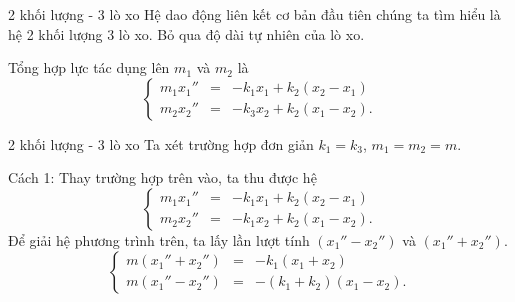 \begin{frame}{2 khối lượng - 3 lò xo}
    Hệ dao động liên kết cơ bản đầu tiên chúng ta tìm hiểu là hệ 2 khối lượng 3 lò xo. Bỏ qua độ dài tự nhiên của lò xo.
    \vspace{2mm}
    \begin{center}
        \scalebox{1}{}
    \end{center}
    Tổng hợp lực tác dụng lên $m_1$ và $m_2$ là
    \begin{equation}
    \left\{
    \begin{array}{ccc}
    m_1 x_1'' &=& - k_1 x_1 + k_2 (x_2 - x_1) \\
    m_2 x_2'' &=& - k_3 x_2 + k_2 (x_1 - x_2).
    \end{array}
    \right.
    \label{3.1_1}
    \end{equation}
\end{frame}

\begin{frame}{2 khối lượng - 3 lò xo}
    Ta xét trường hợp đơn giản $k_1 = k_3$, $m_1 = m_2 = m$. 

    Cách 1: Thay trường hợp trên vào, ta thu được hệ
    \begin{equation}
    \left\{
    \begin{array}{ccc}
    m_1 x_1'' &=& - k_1 x_1 + k_2 (x_2 - x_1) \\
    m_2 x_2'' &=& - k_1 x_2 + k_2 (x_1 - x_2).
    \end{array}
    \right.
    \label{3.1_2}
    \end{equation}
    Để giải hệ phương trình trên, ta lấy lần lượt tính $(x_1'' - x_2'')$ và $(x_1''+x_2'')$.
    \begin{equation}
    \left\{
        \begin{array}{ccc}
        m(x_1''+x_2'') &=& -k_1(x_1+x_2) \\
        m(x_1''-x_2'') &=& -(k_1+k_2)(x_1 - x_2).
        \end{array}
    \right.
    \end{equation}
    
\end{frame}